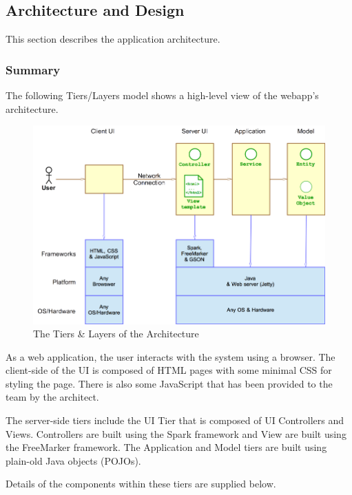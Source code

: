 \hypertarget{architecture-and-design}{%
\subsection{Architecture and Design}\label{architecture-and-design}}

This section describes the application architecture.

\hypertarget{summary}{%
\subsubsection{Summary}\label{summary}}

The following Tiers/Layers model shows a high-level view of the webapp's
architecture.

\begin{figure}
\centering
\includegraphics{architecture-tiers-and-layers.png}
\caption{The Tiers \& Layers of the Architecture}
\end{figure}

As a web application, the user interacts with the system using a
browser. The client-side of the UI is composed of HTML pages with some
minimal CSS for styling the page. There is also some JavaScript that has
been provided to the team by the architect.

The server-side tiers include the UI Tier that is composed of UI
Controllers and Views. Controllers are built using the Spark framework
and View are built using the FreeMarker framework. The Application and
Model tiers are built using plain-old Java objects (POJOs).

Details of the components within these tiers are supplied below.

